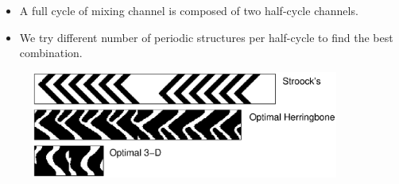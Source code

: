 \documentclass[12pt,t]{beamer}
\begin{document}
\begin{frame}
  \begin{itemize}
    \item A full cycle of mixing channel is composed of two half-cycle channels.
    \item We try different number of periodic structures per half-cycle to find the best combination.
  \end{itemize}
  \begin{figure}
       \includegraphics[width=0.9\textwidth,trim=0cm 0cm 0cm 0cm,clip]{example2fullcycle}
  \end{figure}
\end{frame}
\end{document}
